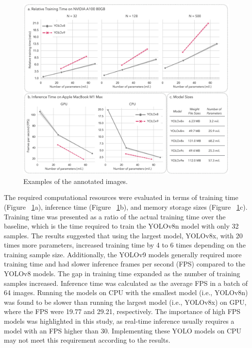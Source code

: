 \begin{figure}[h]
\centering
\includegraphics[width=1\textwidth]{figure_6.jpg}
\caption{Examples of the annotated images.}
\label{fig:resources}
\end{figure}


The required computational resources were evaluated in terms of training time (Figure ~\ref{fig:resources}a), inference time (Figure ~\ref{fig:resources}b), and memory storage sizes (Figure ~\ref{fig:resources}c). Training time was presented as a ratio of the actual training time over the baseline, which is the time required to train the YOLOv8n model with only 32 samples. The results suggested that using the largest model, YOLOv8x, with 20 times more parameters, increased training time by 4 to 6 times depending on the training sample size. Additionally, the YOLOv9 models generally required more training time and had slower inference frames per second (FPS) compared to the YOLOv8 models. The gap in training time expanded as the number of training samples increased. Inference time was calculated as the average FPS in a batch of 64 images. Running the models on CPU with the smallest model (i.e., YOLOv8n) was found to be slower than running the largest model (i.e., YOLOv8x) on GPU, where the FPS were 19.77 and 29.21, respectively. The importance of high FPS models was highlighted in this study, as real-time inference usually requires a model with an FPS higher than 30. Implementing these YOLO models on CPU may not meet this requirement according to the results.



